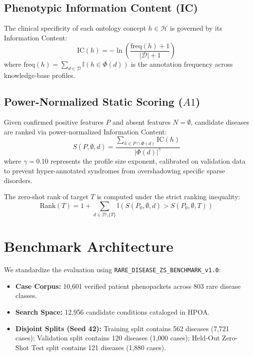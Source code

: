 \documentclass[conference]{IEEEtran}
\begin{document}
\subsection{Phenotypic Information Content (IC)}
The clinical specificity of each ontology concept $h \in \mathcal{H}$ is governed by its Information Content:
\begin{equation}
\text{IC}(h) = -\ln \left( \frac{\text{freq}(h) + 1}{|\mathcal{D}| + 1} \right)
\label{eq:ic}
\end{equation}
where $\text{freq}(h) = \sum_{d \in \mathcal{D}} \mathbb{I}(h \in \Phi(d))$ is the annotation frequency across knowledge-base profiles.

\subsection{Power-Normalized Static Scoring ($A1$)}
Given confirmed positive features $P$ and absent features $N = \emptyset$, candidate diseases are ranked via power-normalized Information Content:
\begin{equation}
S(P, \emptyset, d) = \frac{\sum_{h \in P \cap \Phi(d)} \text{IC}(h)}{|\Phi(d)|^\gamma}
\label{eq:scoring}
\end{equation}
where $\gamma = 0.10$ represents the profile size exponent, calibrated on validation data to prevent hyper-annotated syndromes from overshadowing specific sparse disorders.

The zero-shot rank of target $T$ is computed under the strict ranking inequality:
\begin{equation}
\text{Rank}(T) = 1 + \sum_{d \in \mathcal{D} \setminus \{T\}} \mathbb{I}\left(S(P_0, \emptyset, d) > S(P_0, \emptyset, T)\right)
\end{equation}

\section{Benchmark Architecture}

We standardize the evaluation using \texttt{RARE\_DISEASE\_ZS\_BENCHMARK\_v1.0}:
\begin{itemize}
    \item \textbf{Case Corpus:} 10,601 verified patient phenopackets across 803 rare disease classes.
    \item \textbf{Search Space:} 12,956 candidate conditions cataloged in HPOA.
    \item \textbf{Disjoint Splits (Seed 42):} Training split contains 562 diseases (7,721 cases); Validation split contains 120 diseases (1,000 cases); Held-Out Zero-Shot Test split contains 121 diseases (1,880 cases).
\end{itemize}
\end{document}
